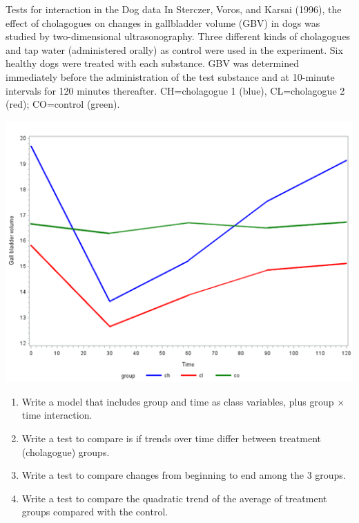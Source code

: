 \documentclass[
  9pt,
  ignorenonframetext,
]{beamer}
\providecommand{\tightlist}{%
  \setlength{\itemsep}{0pt}\setlength{\parskip}{0pt}}
\begin{document}
\begin{frame}{Tests for interaction in the Dog data}
\protect\hypertarget{tests-for-interaction-in-the-dog-data}{}
In Sterczer, Voros, and Karsai (1996), the effect of cholagogues on
changes in gallbladder volume (GBV) in dogs was studied by
two-dimensional ultrasonography. Three different kinds of cholagogues
and tap water (administered orally) as control were used in the
experiment. Six healthy dogs were treated with each substance. GBV was
determined immediately before the administration of the test substance
and at 10-minute intervals for 120 minutes thereafter. CH=cholagogue 1
(blue), CL=cholagogue 2 (red); CO=control (green).

\begin{center}\includegraphics[width=0.5\linewidth]{figs_L5/f5} \end{center}
\end{frame}

\begin{frame}{}
\protect\hypertarget{section-5}{}
\begin{enumerate}
\tightlist
\item
  Write a model that includes group and time as class variables, plus
  group \(\times\) time interaction.
\end{enumerate}

\vspace{\baselineskip}

\begin{enumerate}
\setcounter{enumi}{1}
\tightlist
\item
  Write a test to compare is if trends over time differ between
  treatment (cholagogue) groups.
\end{enumerate}

\vspace{\baselineskip}

\begin{enumerate}
\setcounter{enumi}{2}
\tightlist
\item
  Write a test to compare changes from beginning to end among the 3
  groups.
\end{enumerate}

\vspace{\baselineskip}

\begin{enumerate}
\setcounter{enumi}{3}
\tightlist
\item
  Write a test to compare the quadratic trend of the average of
  treatment groups compared with the control. \vspace{\baselineskip}
\end{enumerate}
\end{frame}
\end{document}
